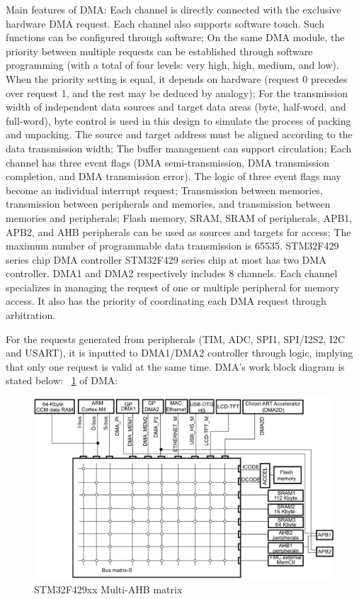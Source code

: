 Main features of DMA:
Each channel is directly connected with the exclusive hardware DMA request. Each channel also supports software touch. Such functions can be configured through software; 
On the same DMA module, the priority between multiple requests can be established through software programming (with a total of four levels: very high, high, medium, and low). When the priority setting is equal, it depends on hardware (request 0 precedes over request 1, and the rest may be deduced by analogy); 
For the transmission width of independent data sources and target data areas (byte, half-word, and full-word), byte control is used in this design to simulate the process of packing and unpacking. The source and target address must be aligned according to the data transmission width; 
The buffer management can support circulation; 
Each channel has three event flags (DMA semi-transmission, DMA transmission completion, and DMA transmission error). The logic of three event flags may become an individual interrupt request; 
Transmission between memories, transmission between peripherals and memories, and transmission between memories and peripherals; 
Flash memory, SRAM, SRAM of peripherals, APB1, APB2, and AHB peripherals can be used as sources and targets for access; 
The maximum number of programmable data transmission is 65535. 
STM32F429 series chip DMA controller 
STM32F429 series chip at most has two DMA controller. DMA1 and DMA2 respectively includes 8 channels. Each channel specializes in managing the request of one or multiple peripheral for memory access. It also has the priority of coordinating each DMA request through arbitration. 

For the requests generated from peripherals (TIM, ADC, SPI1, SPI/I2S2, I2C and USART), it is inputted to DMA1/DMA2 controller through logic, implying that only one request is valid at the same time. 
DMA’s work block diagram is stated below: 
~\ref{fig:2.13}  of DMA:
\begin{figure}[!ht]
	\centering
	\includegraphics[width=15cm]{grafiken/2.13.eps}
	\caption{STM32F429xx Multi-AHB matrix} 
	\label{fig:2.13}
\end{figure}
\FloatBarrier


